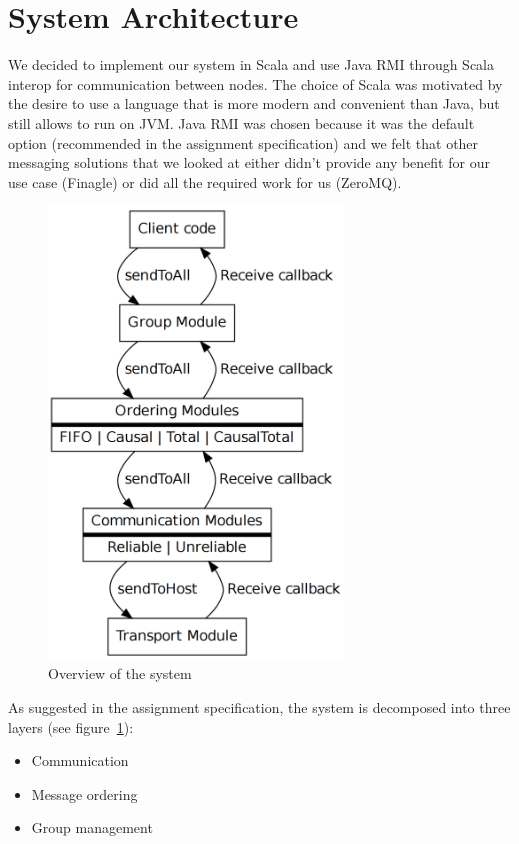 \documentclass[10pt, oneside]{article}
\begin{document}
\section{System Architecture}

We decided to implement our system in Scala and use Java RMI through Scala
interop for communication between nodes. The choice of Scala was motivated by
the desire to use a language that is more modern and convenient than Java, but
still allows to run on JVM. Java RMI was chosen because it was the default
option (recommended in the assignment specification) and we felt that other
messaging solutions that we looked at either didn't provide any benefit for our
use case (Finagle) or did all the required work for us (ZeroMQ).

\begin{figure}[h]
\centering
\includegraphics[height=12cm]{graph2}
\caption{Overview of the system}
\label{fig:modules}
\end{figure}

As suggested in the assignment specification, the system is decomposed into
three layers (see figure~\ref{fig:modules}):

\begin{itemize}
\item Communication
\item Message ordering
\item Group management
\end{itemize}
\end{document}
